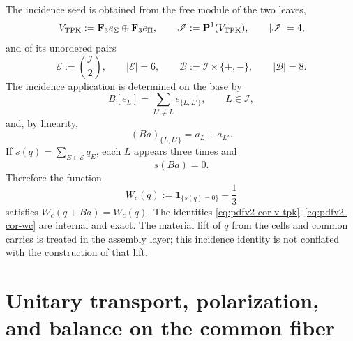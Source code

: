 The incidence seed is obtained from the free module of the two leaves,
\begin{equation}
\label{eq:pdfv2-cor-v-tpk}
 V_{\rm TPK}:=\mathbf F_3e_\Sigma\oplus\mathbf F_3e_\Pi,
 \qquad
 \mathscr I:=\mathbf P^1(V_{\rm TPK}),
 \qquad |\mathscr I|=4,
\end{equation}
and of its unordered pairs
\begin{equation}
\label{eq:pdfv2-cor-incidencias}
 \mathscr E:=\binom{\mathscr I}{2},
 \qquad |\mathscr E|=6,
 \qquad
 \mathscr B:=\mathscr I\times\{+,-\},
 \qquad |\mathscr B|=8.
\end{equation}
The incidence application is determined on the base by
\begin{equation}
\label{eq:pdfv2-cor-b-incidencia-generadores}
 B[e_L]=\sum_{L'\neq L}e_{\{L,L'\}},
 \qquad L\in\mathscr I,
\end{equation}
and, by linearity,
\begin{equation}
\label{eq:pdfv2-cor-b-incidencia-coordenadas}
 (Ba)_{\{L,L'\}}=a_L+a_{L'}.
\end{equation}
If \(s(q)=\sum_{E\in\mathscr E}q_E\), each \(L\) appears three times and
\begin{equation}
\label{eq:pdfv2-cor-sb-cero}
 s(Ba)=0.
\end{equation}
Therefore the function
\begin{equation}
\label{eq:pdfv2-cor-wc}
 W_c(q):=\mathbf1_{\{s(q)=0\}}-\frac13
\end{equation}
satisfies \(W_c(q+Ba)=W_c(q)\). The identities
\eqref{eq:pdfv2-cor-v-tpk}--\eqref{eq:pdfv2-cor-wc} are internal and exact.
The material lift of \(q\) from the cells and common carries is treated in
the assembly layer; this incidence identity is not conflated with the
construction of that lift.

\section{Unitary transport, polarization, and balance on the common fiber}

